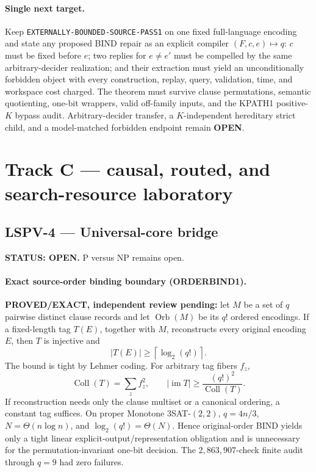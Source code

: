\documentclass[11pt]{article}
\begin{document}
\paragraph{Single next target.}
Keep \texttt{EXTERNALLY-BOUNDED-SOURCE-PASS1} on one fixed full-language
encoding and state any proposed BIND repair as an explicit compiler
\((F,c,e)\mapsto q\): \(c\) must be fixed before \(e\); two replies for
\(e\ne e'\) must be compelled by the same arbitrary-decider realization; and
their extraction must yield an unconditionally forbidden object with every
construction, replay, query, validation, time, and workspace cost charged.
The theorem must survive clause permutations, semantic quotienting,
one-bit wrappers, valid off-family inputs, and the KPATH1 positive-\(K\)
bypass audit.  Arbitrary-decider transfer, a \(K\)-independent hereditary
strict child, and a model-matched forbidden endpoint remain \textbf{OPEN}.

\section{Track C --- causal, routed, and search-resource laboratory}

\subsection{LSPV-4 --- Universal-core bridge}
\textbf{STATUS: OPEN.} P versus NP remains open.

\paragraph{Exact source-order binding boundary (ORDERBIND1).}
\textbf{PROVED/EXACT, independent review pending:} let \(M\) be a set of
\(q\) pairwise distinct clause records and let \(\operatorname{Orb}(M)\) be
its \(q!\) ordered encodings.  If a fixed-length tag \(T(E)\), together with
\(M\), reconstructs every original encoding \(E\), then \(T\) is injective and
\[
 |T(E)|\ge\left\lceil\log_2(q!)\right\rceil .
\]
The bound is tight by Lehmer coding.  For arbitrary tag fibers \(f_z\),
\[
 \operatorname{Coll}(T)=\sum_z f_z^2,\qquad
 |\operatorname{im}T|\ge\frac{(q!)^2}{\operatorname{Coll}(T)}.
\]
If reconstruction needs only the clause multiset or a canonical ordering, a
constant tag suffices.  On proper Monotone \(3\)SAT-\((2,2)\),
\(q=4n/3\), \(N=\Theta(n\log n)\), and
\(\log_2(q!)=\Theta(N)\).  Hence original-order BIND yields only a tight
linear explicit-output/representation obligation and is unnecessary for the
permutation-invariant one-bit decision.  The \(2{,}863{,}907\)-check finite
audit through \(q=9\) had zero failures.
\end{document}
